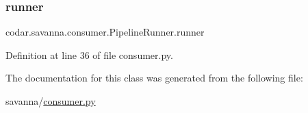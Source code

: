 \subsubsection{\texorpdfstring{runner}{runner}}
{\footnotesize\ttfamily codar.\+savanna.\+consumer.\+Pipeline\+Runner.\+runner}



Definition at line 36 of file consumer.\+py.



The documentation for this class was generated from the following file\+:\begin{DoxyCompactItemize}
\item 
savanna/\hyperlink{consumer_8py}{consumer.\+py}\end{DoxyCompactItemize}
